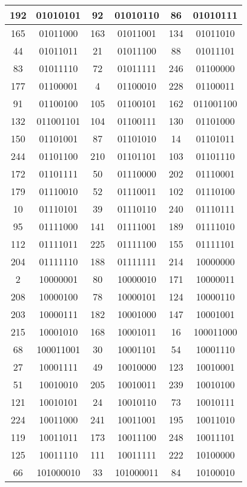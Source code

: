 \documentclass[conference,onecolumn,12pt]{IEEEtran}
\numberwithin{equation}{subsection}
\begin{document}
\begin{table}[h]
\begin{tabular}{cccccc}
192 & 01010101 & 92 & 01010110 & 86 & 01010111 \\ \hline
165 & 01011000 & 163 & 01011001 & 134 & 01011010 \\ \hline
44 & 01011011 & 21 & 01011100 & 88 & 01011101 \\ \hline
83 & 01011110 & 72 & 01011111 & 246 & 01100000 \\ \hline
177 & 01100001 & 4 & 01100010 & 228 & 01100011 \\ \hline
91 & 01100100 & 105 & 01100101 & 162 & 011001100 \\ \hline
132 & 011001101 & 104 & 01100111 & 130 & 01101000 \\ \hline
150 & 01101001 & 87 & 01101010 & 14 & 01101011 \\ \hline
244 & 01101100 & 210 & 01101101 & 103 & 01101110 \\ \hline
172 & 01101111 & 50 & 01110000 & 202 & 01110001 \\ \hline
179 & 01110010 & 52 & 01110011 & 102 & 01110100 \\ \hline
10 & 01110101 & 39 & 01110110 & 240 & 01110111 \\ \hline
95 & 01111000 & 141 & 01111001 & 189 & 01111010 \\ \hline
112 & 01111011 & 225 & 01111100 & 155 & 01111101 \\ \hline
204 & 01111110 & 188 & 01111111 & 214 & 10000000 \\ \hline
2 & 10000001 & 80 & 10000010 & 171 & 10000011 \\ \hline
208 & 10000100 & 78 & 10000101 & 124 & 10000110 \\ \hline
203 & 10000111 & 182 & 10001000 & 147 & 10001001 \\ \hline
215 & 10001010 & 168 & 10001011 & 16 & 100011000 \\ \hline
68 & 100011001 & 30 & 10001101 & 54 & 10001110 \\ \hline
27 & 10001111 & 49 & 10010000 & 123 & 10010001 \\ \hline
51 & 10010010 & 205 & 10010011 & 239 & 10010100 \\ \hline
121 & 10010101 & 24 & 10010110 & 73 & 10010111 \\ \hline
224 & 10011000 & 241 & 10011001 & 195 & 10011010 \\ \hline
119 & 10011011 & 173 & 10011100 & 248 & 10011101 \\ \hline
125 & 10011110 & 111 & 10011111 & 222 & 10100000 \\ \hline
66 & 101000010 & 33 & 101000011 & 84 & 10100010 \\ \hline

\end{tabular}
\end{table}
\end{document}
